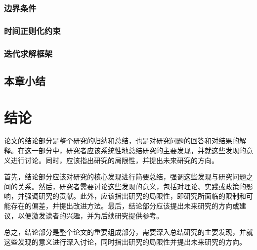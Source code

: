 \documentclass[master,academic]{ysuthesis} %
\begin{document}
		\subsection{边界条件}
		\subsection{时间正则化约束}
		\subsection{迭代求解框架}
	\section{本章小结}
	
	

	\chapter{结论}
		论文的结论部分是整个研究的归纳和总结，也是对研究问题的回答和对结果的解释。在这一部分中，研究者应该系统性地总结研究的主要发现，并就这些发现的意义进行讨论。同时，应该指出研究的局限性，并提出未来研究的方向。

		首先，结论部分应该对研究的核心发现进行简要总结，强调这些发现与研究问题之间的关系。然后，研究者需要讨论这些发现的意义，包括对理论、实践或政策的影响，并强调研究的贡献。此外，应该指出研究的局限性，即研究所面临的限制和可能存在的偏差，并提出改进方法。最后，结论部分应该提出未来研究的方向或建议，以便激发读者的兴趣，并为后续研究提供参考。

		总之，结论部分是整个论文的重要组成部分，需要深入总结研究的主要发现，并就这些发现的意义进行深入讨论，同时指出研究的局限性并提出未来研究的方向。


\end{document}
